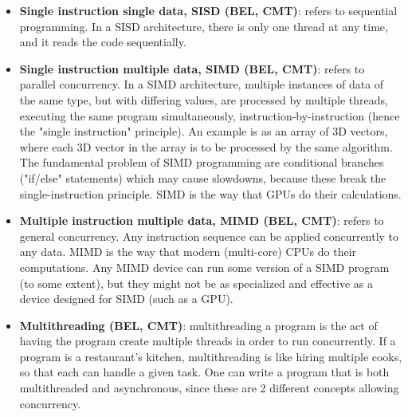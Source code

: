 \documentclass{article}
\begin{document}
\begin{itemize}
	\item \textbf{Single instruction single data, SISD (BEL, CMT)}: refers to sequential programming. In a SISD architecture, there is only one thread at any time, and it reads the code sequentially.

	\item \textbf{Single instruction multiple data, SIMD (BEL, CMT)}: refers to parallel concurrency. In a SIMD architecture, multiple instances of data of the same type, but with differing values, are processed by multiple threads, executing the same program simultaneously, instruction-by-instruction (hence the "single instruction" principle). An example is as an array of 3D vectors, where each 3D vector in the array is to be processed by the same algorithm. The fundamental problem of SIMD programming are conditional branches ("if/else" statements) which may cause slowdowns, because these break the single-instruction principle. SIMD is the way that GPUs do their calculations.

	\item \textbf{Multiple instruction multiple data, MIMD (BEL, CMT)}: refers to general concurrency. Any instruction sequence can be applied concurrently to any data. MIMD is the way that modern (multi-core) CPUs do their computations. Any MIMD device can run some version of a SIMD program (to some extent), but they might not be as specialized and effective as a device designed for SIMD (such as a GPU).

	\item \textbf{Multithreading (BEL, CMT)}: multithreading a program is the act of having the program create multiple threads in order to run concurrently. If a program is a restaurant's kitchen, multithreading is like hiring multiple cooks, so that each can handle a given task. One can write a program that is both multithreaded and asynchronous, since these are 2 different concepts allowing concurrency.


\end{itemize}
\end{document}
